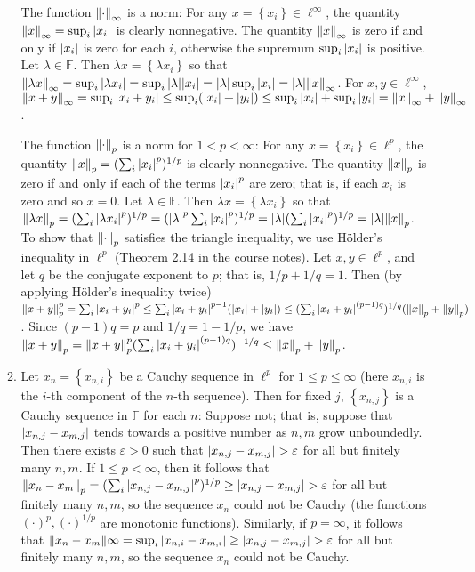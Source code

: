 \documentclass[11pt,leqno]{article}
\theoremstyle{plain}
\theoremstyle{definition}
\numberwithin{equation}{section}
\numberwithin{lem}{section}
\newcommand{\cbr}[1]{\left\{#1\right\}}
\begin{document}
\begin{enumerate}
\begin{enumerate}
    The function $\norm{\cdot}_\infty$ is a norm: For any $x = \cbr{x_i}\in \ell^\infty$, the quantity $\norm{x}_\infty = \sup_i\abs{x_i}$ is clearly nonnegative. The quantity $\norm{x}_\infty$ is zero if and only if $\abs{x_i}$ is zero for each $i$, otherwise the supremum $\sup_i\abs{x_i}$ is positive. Let $\lambda\in \mathbb F$. Then $\lambda x = \cbr{\lambda x_i}$ so that $\norm{\lambda x}_\infty = \sup_i\abs{\lambda x_i} = \sup_i \abs{\lambda}\abs{x_i} = \abs{\lambda}\sup_i\abs{x_i} = \abs{\lambda}\norm{x}_\infty$. For $x,y\in\ell^\infty$, $\norm{x+y}_\infty = \sup_i\abs{x_i+y_i}\leq \sup_i(\abs{x_i} + \abs{y_i}) \leq \sup_i\abs{x_i} + \sup_i\abs{y_i} = \norm{x}_\infty + \norm{y}_\infty$.
    
    The function $\norm{\cdot}_p$ is a norm for $1 < p < \infty$: For any $x = \cbr{x_i}\in \ell^p$, the quantity $\norm{x}_p = (\sum_i \abs{x_i}^p)^{1/p}$ is clearly nonnegative. The quantity $\norm{x}_p$ is zero if and only if each of the terms $\abs{x_i}^p$ are zero; that is, if each $x_i$ is zero and so $x = 0$. Let $\lambda\in \mathbb F$. Then $\lambda x = \cbr{\lambda x_i}$ so that $\norm{\lambda x}_p = (\sum_i \abs{\lambda x_i}^p)^{1/p} = (\abs{\lambda}^p\sum_i \abs{x_i}^p)^{1/p} = \abs{\lambda}(\sum_i \abs{x_i}^p)^{1/p} = \abs{\lambda}\norm{x}_p$. To show that $\norm{\cdot}_p$ satisfies the triangle inequality, we use H\"older's inequality in $\ell^p$ (Theorem 2.14 in the course notes). Let $x,y\in \ell^p$, and let $q$ be the conjugate exponent to $p$; that is, $1/p+ 1/q =1$. Then (by applying H\"older's inequality twice) $\norm{x+y}_p^p = \sum_i\abs{x_i + y_i}^p \leq \sum_i \abs{x_i + y_i}^{p-1}(\abs{x_i} + \abs{y_i}) \leq (\sum_i \abs{x_i + y_i}^{(p-1)q})^{1/q}(\norm{x}_p + \norm{y}_p)$. Since $(p-1)q = p$ and $1/q = 1-1/p$, we have $\norm{x+y}_p = \norm{x+y}_p^p (\sum_i \abs{x_i + y_i}^{(p-1)q})^{-1/q}\leq \norm{x}_p + \norm{y}_p$.
    
    \item Let $x_n = \cbr{x_{n,i}}$ be a Cauchy sequence in $\ell^p$ for $1\leq p \leq \infty$ (here $x_{n,i}$ is the $i$-th component of the $n$-th sequence). Then for fixed $j$, $\cbr{x_{n,j}}$ is a Cauchy sequence in $\mathbb F$ for each $n$: Suppose not; that is, suppose that $\abs{x_{n,j} - x_{m,j}}$ tends towards a positive number as $n,m$ grow unboundedly. Then there exists $\varepsilon>0 $ such that $\abs{x_{n,j} - x_{m,j}} > \varepsilon$ for all but finitely many $n,m$. If $1\leq p < \infty$, then it follows that $\norm{x_n - x_m}_p = (\sum_i\abs{x_{n,j} - x_{m,j}}^p)^{1/p}\geq \abs{x_{n,j} - x_{m,j}} > \varepsilon$ for all but finitely many $n,m$, so the sequence $x_n$ could not be Cauchy (the functions $(\cdot)^p,(\cdot)^{1/p}$ are monotonic functions). Similarly, if $p = \infty$, it follows that $\norm{x_n-x_m}\infty = \sup_i\abs{x_{n,i} - x_{m,i}}\geq \abs{x_{n,j} - x_{m,j}} > \varepsilon$ for all but finitely many $n,m$, so the sequence $x_n$ could not be Cauchy. 
    

\end{enumerate}
\end{enumerate}
\end{document}
